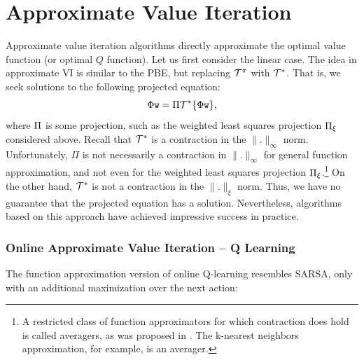 \section{Approximate Value Iteration}
Approximate value iteration algorithms directly approximate the optimal value function (or optimal $Q$ function). Let us first consider the linear case. The idea in approximate VI is similar to the PBE, but replacing $\mathcal{T}^\pi$ with $\mathcal{T}^*$. That is, we seek solutions to the following projected equation:
\begin{equation*}
    \Phi {\tt w} = \Pi \mathcal{T}^* \{\Phi {\tt w}\},
\end{equation*}
where $\Pi$ is some projection, such as the weighted least squares projection $\Pi_\xi$ considered above. Recall that $\mathcal{T}^*$ is a contraction in the $\|.\|_\infty$ norm. Unfortunately, $\Pi$ is not necessarily a contraction in $\|.\|_\infty$ for general function approximation, and not even for the weighted least squares projection $\Pi_\xi$.\footnote{A restricted class of function approximators for which contraction does hold is called averagers, as was proposed in \cite{gordon1995stable}. The k-nearest neighbors approximation, for example, is an averager.} On the other hand, $\mathcal{T}^*$ is not a contraction in the $\|.\|_\xi$ norm. Thus, we have no guarantee that the projected equation has a solution. Nevertheless, algorithms based on this approach have achieved impressive success in practice. 


\subsubsection{Online Approximate Value Iteration -- Q Learning}
The function approximation version of online Q-learning resembles SARSA, only with an additional maximization over the next action:

